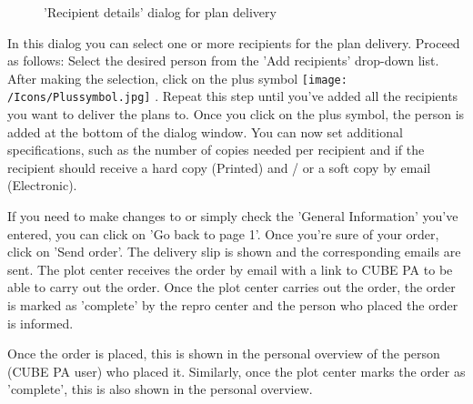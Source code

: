 \begin{figure}[H]
\caption{'Recipient details' dialog for plan delivery}
\end{figure}

In this dialog you can select one or more recipients for the plan delivery. Proceed as follows: Select the desired person from the 'Add recipients' drop-down list. After making the selection, click on the plus symbol \texttt{[image: /Icons/Plussymbol.jpg]} . Repeat this step until you've added all the recipients you want to deliver the plans to. Once you click on the plus symbol, the person is added at the bottom of the dialog window. You can now set additional specifications, such as the number of copies needed per recipient and if the recipient should receive a hard copy (Printed) and / or a soft copy by email (Electronic).

\vspace{\baselineskip}

If you need to make changes to or simply check the 'General Information' you've entered, you can click on 'Go back to page 1'. Once you're sure of your order, click on 'Send order'. The delivery slip is shown and the corresponding emails are sent. The plot center receives the order by email with a link to CUBE PA to be able to carry out the order. Once the plot center carries out the order, the order is marked as 'complete' by the repro center and the person who placed the order is informed.

\vspace{\baselineskip}

Once the order is placed, this is shown in the personal overview of the person (CUBE PA user) who placed it. Similarly, once the plot center marks the order as 'complete', this is also shown in the personal overview.

\vspace{\baselineskip}

